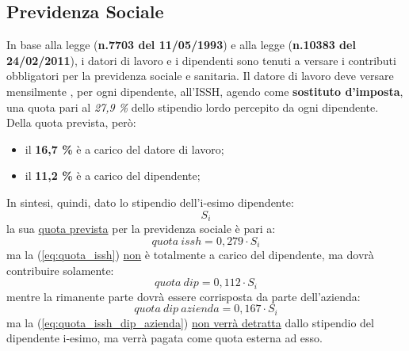 \subsection[Previdenza Sociale]{Previdenza Sociale}
\label{sec:previdenza_sociale_albania}
In base alla legge (\textbf{n.7703 del 11/05/1993}) e alla legge (\textbf{n.10383 del 24/02/2011}), i datori di lavoro e i dipendenti sono tenuti a versare i contributi obbligatori per la previdenza sociale e sanitaria. \newline
Il datore di lavoro deve versare mensilmente , per ogni dipendente, all'\ac{ISSH}, agendo come \textbf{sostituto d'imposta}, una quota pari al \textit{27,9 \%} dello stipendio lordo percepito da ogni dipendente.
Della quota prevista, però:
\begin{itemize}
\item il \textbf{16,7 \%} è a carico del datore di lavoro;
\item il \textbf{11,2 \%} è a carico del dipendente;
\end{itemize}
In sintesi, quindi, dato lo stipendio dell'i-esimo dipendente:
\begin{equation}
\label{eq:stipendio_dip}
S_i
\end{equation}
la sua \underline{quota prevista} per la previdenza sociale è pari a:
\begin{equation}
\label{eq:quota_issh}
quota \: issh = 0,279 \cdot S_i
\end{equation}
ma la (\ref{eq:quota_issh}) \underline{non} è totalmente a carico del dipendente, ma dovrà contribuire solamente:
\begin{equation}
\label{eq:quota_issh_dip}
quota \: dip = 0,112 \cdot S_i
\end{equation}
mentre la rimanente parte dovrà essere corrisposta da parte dell'azienda:
\begin{equation}
\label{eq:quota_issh_dip_azienda}
quota \: dip \:azienda = 0,167 \cdot S_i
\end{equation}
ma la (\ref{eq:quota_issh_dip_azienda}) \underline{non verrà detratta} dallo stipendio del dipendente i-esimo, ma verrà pagata come quota esterna ad esso.

